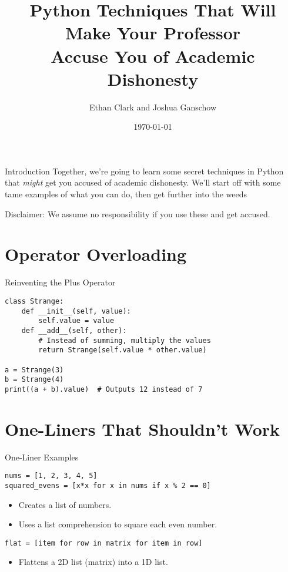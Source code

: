 \documentclass{beamer}
\title{Python Techniques That Will Make Your Professor\\Accuse You of Academic Dishonesty}
\author{Ethan Clark and Joshua Ganschow}
\date{\today}
\begin{document}
\frame{\titlepage}

\begin{frame}{Introduction}
Together, we're going to learn some secret techniques in Python that \textit{might} get you accused of academic dishonesty. We'll start off with some tame examples of what you can do, then get further into the weeds
\pause
\vspace{5em}

Disclaimer: We assume no responsibility if you use these and get accused.
\end{frame}

\section{Operator Overloading}
\begin{frame}[fragile]{Reinventing the Plus Operator}
\begin{lstlisting}
class Strange:
    def __init__(self, value):
        self.value = value
    def __add__(self, other):
        # Instead of summing, multiply the values
        return Strange(self.value * other.value)
        
a = Strange(3)
b = Strange(4)
print((a + b).value)  # Outputs 12 instead of 7
\end{lstlisting}
\end{frame}

\section{One-Liners That Shouldn't Work}
\begin{frame}[fragile]{One-Liner Examples}
\begin{lstlisting}
nums = [1, 2, 3, 4, 5]
squared_evens = [x*x for x in nums if x % 2 == 0]
\end{lstlisting}
\vspace{1em}
 
\begin{itemize}
  \item Creates a list of numbers.
  \item Uses a list comprehension to square each even number.
\end{itemize}
\vspace{1em}
\begin{lstlisting}
flat = [item for row in matrix for item in row]
\end{lstlisting}
\vspace{1em}
 
\begin{itemize}
  \item Flattens a 2D list (matrix) into a 1D list.
\end{itemize}
\end{frame}
\end{document}
